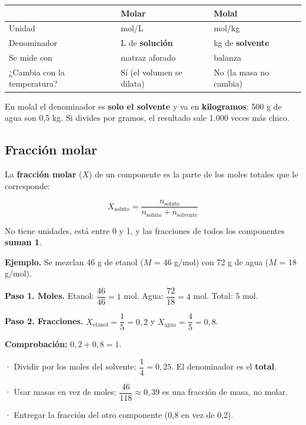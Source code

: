   
\begin{center}\small
\begin{tabularx}{\linewidth}{@{}>{\raggedright\arraybackslash\hsize=1.09\hsize}X>{\raggedright\arraybackslash\hsize=1.01\hsize}X>{\raggedright\arraybackslash\hsize=0.89\hsize}X@{}}
\toprule
 & \textbf{Molar} & \textbf{Molal} \\
\midrule
Unidad & mol/L & mol/kg \\
Denominador & L de \textbf{solución} & kg de \textbf{solvente} \\
Se mide con & matraz aforado & balanza \\
¿Cambia con la temperatura? & Sí (el volumen se dilata) & No (la masa no cambia) \\
\bottomrule
\end{tabularx}
\end{center}
 
\begin{ojo}[{Ojo}] En molal el denominador es \textbf{solo el solvente} y va en \textbf{kilogramos}: 500 g de agua son 0,5 kg. Si divides por gramos, el resultado sale 1.000 veces más chico.\end{ojo}
\subsection{Fracción molar}
La \textbf{fracción molar} ($X$) de un componente es la parte de los moles totales que le corresponde:

 \[ X_{\text{soluto}} = \dfrac{n_{\text{soluto}}}{n_{\text{soluto}} + n_{\text{solvente}}} \] 

No tiene unidades, está entre 0 y 1, y las fracciones de todos los componentes \textbf{suman 1}.

 

\textbf{Ejemplo.} Se mezclan 46 g de etanol ($M$ = 46 g/mol) con 72 g de agua ($M$ = 18 g/mol).

 

\textbf{Paso 1. Moles.} Etanol: $\dfrac{46}{46} = 1$ mol. Agua: $\dfrac{72}{18} = 4$ mol. Total: 5 mol.

 

\textbf{Paso 2. Fracciones.} $X_{\text{etanol}} = \dfrac{1}{5} = 0{,}2$ y $X_{\text{agua}} = \dfrac{4}{5} = 0{,}8$.

 

\textbf{Comprobación:} $0{,}2 + 0{,}8 = 1$. 

  
\begin{ojo} · Dividir por los moles del solvente: $\dfrac{1}{4} = 0{,}25$. El denominador es el \textbf{total}.\par · Usar masas en vez de moles: $\dfrac{46}{118} \approx 0{,}39$ es una fracción de masa, no molar.\par · Entregar la fracción del otro componente (0,8 en vez de 0,2).\end{ojo}
 
